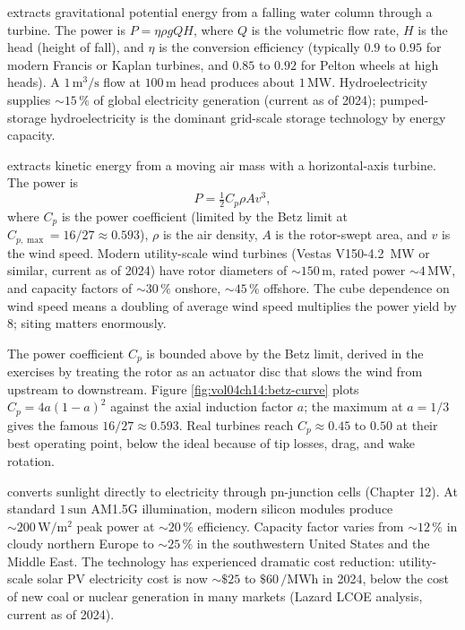  extracts gravitational potential
energy from a falling water column through a turbine. The power is
$P = \eta\rho g Q H$, where $Q$ is the volumetric flow rate, $H$ is
the head (height of fall), and $\eta$ is the conversion efficiency
(typically $0.9$ to $0.95$ for modern Francis or Kaplan turbines, and
$0.85$ to $0.92$ for Pelton wheels at high heads). A $1\,\si{\meter
\cubed\per\second}$ flow at $100\,\si{\meter}$ head produces about
$1\,\si{\mega\watt}$. Hydroelectricity supplies $\sim 15\,\%$ of
global electricity generation (current as of 2024); pumped-storage
hydroelectricity is the dominant grid-scale storage technology by
energy capacity.

 extracts kinetic energy from a moving air
mass with a horizontal-axis turbine. The power is
\[
P = \tfrac{1}{2}C_{p}\rho A v^{3},
\]
where $C_{p}$ is the power coefficient (limited by the Betz
limit at $C_{p,\max} = 16/27 \approx 0.593$), $\rho$ is the air
density, $A$ is the rotor-swept area, and $v$ is the wind speed.
Modern utility-scale wind turbines (Vestas V150-4.2~MW or similar,
current as of 2024) have rotor diameters of $\sim 150\,\si{\meter}$,
rated power $\sim 4\,\si{\mega\watt}$, and capacity factors of $\sim
30\,\%$ onshore, $\sim 45\,\%$ offshore. The cube dependence on wind
speed means a doubling of average wind speed multiplies the power
yield by $8$; siting matters enormously.



The power coefficient $C_p$ is bounded above by the Betz limit, derived
in the exercises by treating the rotor as an actuator disc that slows
the wind from upstream to downstream. Figure
\ref{fig:vol04ch14:betz-curve} plots $C_p = 4a(1-a)^2$ against the
axial induction factor $a$; the maximum at $a = 1/3$ gives the famous
$16/27 \approx 0.593$. Real turbines reach $C_p \approx 0.45$ to
$0.50$ at their best operating point, below the ideal because of tip
losses, drag, and wake rotation.

 converts sunlight directly to
electricity through pn-junction cells (Chapter 12). At standard
$1\,\text{sun}$ AM1.5G illumination, modern silicon modules produce
$\sim 200\,\si{\watt\per\meter\squared}$ peak power at $\sim 20\,\%$
efficiency. Capacity factor varies from $\sim 12\,\%$ in cloudy
northern Europe to $\sim 25\,\%$ in the southwestern United States
and the Middle East. The technology has experienced dramatic cost
reduction: utility-scale solar PV electricity cost is now $\sim
\$25$ to $\$60\,\si{\per\mega\watt\hour}$ in 2024, below the cost of
new coal or nuclear generation in many markets (Lazard LCOE
analysis, current as of 2024).

